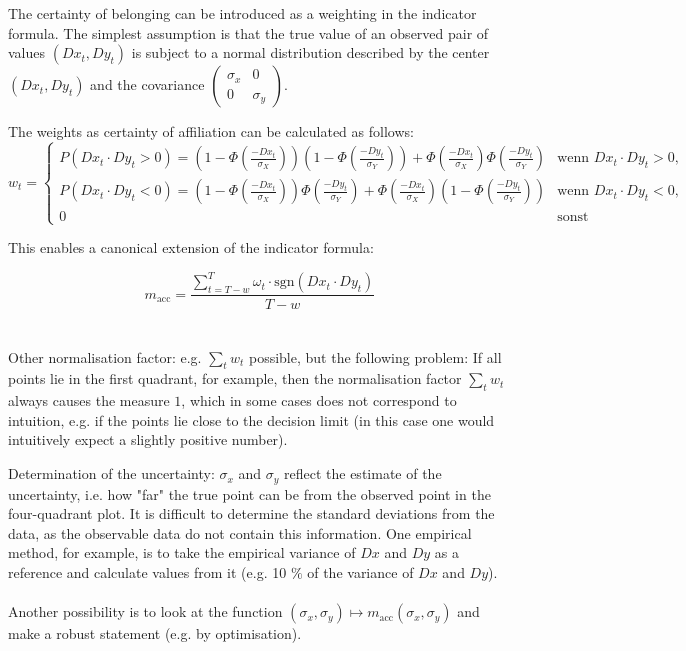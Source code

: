 \documentclass[oneside]{article}
\theoremstyle{plain}%
\theoremstyle{definition}
\begin{document}
The certainty of belonging can be introduced as a weighting in the indicator formula. The simplest assumption is that the true value of an observed pair of values $(Dx_t,Dy_t)$ is subject to a normal distribution described by the center $(Dx_t,Dy_t)$ and the covariance
$\begin{pmatrix} \sigma_x & 0 \\
0 & \sigma_y 
\end{pmatrix}$.

The weights as certainty of affiliation can be calculated as follows:
\[ 
w_t = 
\begin{cases} 
  P(Dx_t \cdot Dy_t > 0) = \left(1 - \Phi\left(\frac{-Dx_t}{\sigma_X}\right)\right)\left(1 - \Phi\left(\frac{-Dy_t}{\sigma_Y}\right)\right) + \Phi\left(\frac{-Dx_t}{\sigma_X}\right) \Phi\left(\frac{-Dy_t}{\sigma_Y}\right) & \text{wenn } Dx_t \cdot Dy_t > 0,  \\
  P(Dx_t \cdot Dy_t < 0) = \left(1 - \Phi\left(\frac{-Dx_t}{\sigma_X}\right)\right) \Phi\left(\frac{-Dy_t}{\sigma_Y}\right) + \Phi\left(\frac{-Dx_t}{\sigma_X}\right) \left(1 - \Phi\left(\frac{-Dy_t}{\sigma_Y}\right)\right)  & \text{wenn } Dx_t \cdot Dy_t < 0,  \\
  0 & \text{sonst} 
\end{cases}
\]

This enables a canonical extension of the indicator formula:


\[m_{\text{acc}} = \frac{\sum_{t=T-w}^T \omega_t \cdot \text{sgn}(Dx_t\cdot Dy_t)}{T-w}\]\\\\
Other normalisation factor: e.g. $\sum_t w_t$ possible, but the following problem: If all points lie in the first quadrant, for example, then the normalisation factor $\sum_t w_t$ always causes the measure $1$, which in some cases does not correspond to intuition, e.g. if the points lie close to the decision limit (in this case one would intuitively expect a slightly positive number). 

Determination of the uncertainty: $\sigma_x$ and $\sigma_y$ reflect the estimate of the uncertainty, i.e. how "far" the true point can be from the observed point in the four-quadrant plot. It is difficult to determine the standard deviations from the data, as the observable data do not contain this information. One empirical method, for example, is to take the empirical variance of $Dx$ and $Dy$ as a reference and calculate values from it (e.g. 10 $\%$ of the variance of $Dx$ and $Dy$).\\\\
Another possibility is to look at the function $(\sigma_x,\sigma_y)\mapsto m_{\text{acc}}(\sigma_x,\sigma_y)$ and make a robust statement (e.g. by optimisation).
\end{document}
